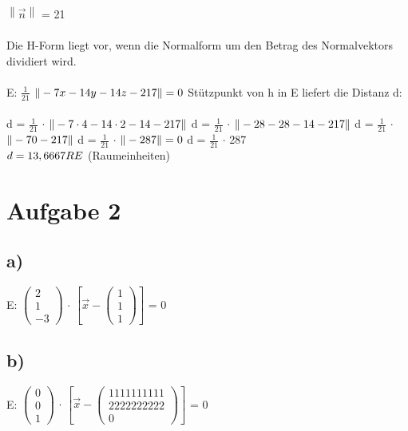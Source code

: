 \documentclass{article}
\begin{document}
	$\left\|\vec{n}\right\|$ = 21 \\ \\
	Die H-Form liegt vor, wenn die Normalform um den Betrag des Normalvektors dividiert wird. \\ \\
	E: $\frac{1}{21}$ $\|-7x - 14y -14z -217 \| = 0 \\ \\$
	Stützpunkt von h in E liefert die Distanz d: \\ \\
	d = $\frac{1}{21}$ $\cdot$ $\|-7 \cdot 4 - 14 \cdot 2 -14 -217 \| \\$
	d =  $\frac{1}{21}$ $\cdot$ $\|-28 - 28 -14 -217 \| \\$
	d =  $\frac{1}{21}$ $\cdot$ $\|-70 -217 \| \\$
	d =  $\frac{1}{21}$ $\cdot$ $\|-287 \| = 0 \\$
	d = $\frac{1}{21}$ $\cdot$ 287 \\$ \\
	d = 13,6667 RE$ (Raumeinheiten)
	\section*{Aufgabe 2}
	\subsection*{a)}
	E: 
	$\left(\begin{array}{c}
	2 \\ 1 \\ -3
	\end{array}\right)$
	$\cdot$ $\left[\vec{x} - 
	\left(\begin{array}{c}
	1 \\ 1 \\ 1
	\end{array}\right)
	\right]$
	= 0 \\
	\subsection*{b)}
	E: 
	$\left(\begin{array}{c}
	0 \\ 0 \\ 1
	\end{array}\right)$
	$\cdot$ $\left[\vec{x} - 
	\left(\begin{array}{c}
	1111111111 \\ 2222222222 \\ 0
	\end{array}\right)
	\right]$
	= 0 \\
\end{document}
